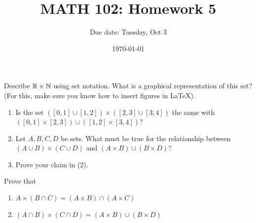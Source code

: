 \documentclass[12pt]{amsart}
\title{ MATH 102: Homework 5}
\author{Due date: Tuesday, Oct 3}
\date{\today}
\begin{document}
\maketitle

\begin{problem}
    Describe $\mathbb{R} \times \mathbb{N}$ using set notation.
    What is a graphical representation of this set? (For this, make sure you know
    how to insert figures in LaTeX).
\end{problem}


\begin{problem}
    \begin{enumerate}
        \item Is the set $([0,1] \cup [1,2]) \times ([2,3] \cup [3,4])$ the same with 
    $([0,1]\times [2,3])\cup ([1,2]\times [3,4])$?
        \item Let  $A,B,C,D$ be sets. What must be true for the relationship between $(A\cup B) \times (C\cup D)$
    and $(A\times B) \cup (B\times D)$?
        \item Prove your claim in (2).
    \end{enumerate}
\end{problem}

\begin{problem}
    Prove that 
    \begin{enumerate}
        \item $A \times (B\cap C) =  (A\times B) \cap (A \times C)$
        \item $(A\cap B) \times (C\cap D)= (A\times B) \cup (B\times D)$
    \end{enumerate}
\end{problem}
\end{document}
